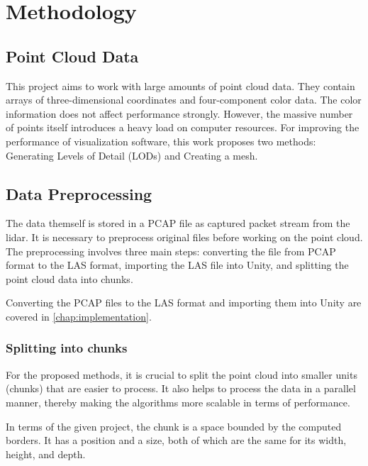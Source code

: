 \chapter{Methodology}
\label{chap:methodology}

\graphicspath{{figs/methodology/}}

\section{Point Cloud Data}
\label{sec:point_cloud_data}

This project aims to work with large amounts of point cloud data. They contain arrays of three-dimensional coordinates and four-component color data. The color information does not affect performance strongly. However, the massive number of points itself introduces a heavy load on computer resources. For improving the performance of visualization software, this work proposes two methods: Generating Levels of Detail (LODs) and Creating a mesh.


\section{Data Preprocessing}
\label{sec:data_preprocessing}

The data themself is stored in a PCAP file as captured packet stream from the lidar. It is necessary to preprocess original files before working on the point cloud. The preprocessing involves three main steps: converting the file from PCAP format to the LAS format, importing the LAS file into Unity, and splitting the point cloud data into chunks.

Converting the PCAP files to the LAS format and importing them into Unity are covered in \autoref{chap:implementation}.

\subsection{Splitting into chunks}

For the proposed methods, it is crucial to split the point cloud into smaller units (chunks) that are easier to process. It also helps to process the data in a parallel manner, thereby making the algorithms more scalable in terms of performance.

In terms of the given project, the chunk is a space bounded by the computed borders. It has a position and a size, both of which  are the same for its width, height, and depth.

